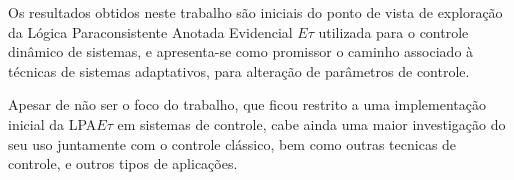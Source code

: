Os resultados obtidos neste trabalho são iniciais 
do ponto de vista de exploração da 
Lógica Paraconsistente Anotada Evidencial $E\tau$ 
utilizada para o controle dinâmico de sistemas, 
e apresenta-se como promissor o caminho 
associado à técnicas de sistemas adaptativos,
para alteração de parâmetros de controle.

Apesar de não ser o foco do trabalho, 
que ficou restrito a uma implementação inicial 
da LPA$E\tau$ em sistemas de controle,
cabe ainda uma maior investigação do seu uso
juntamente com o controle clássico,
bem como outras tecnicas de controle,
e outros tipos de aplicações.





